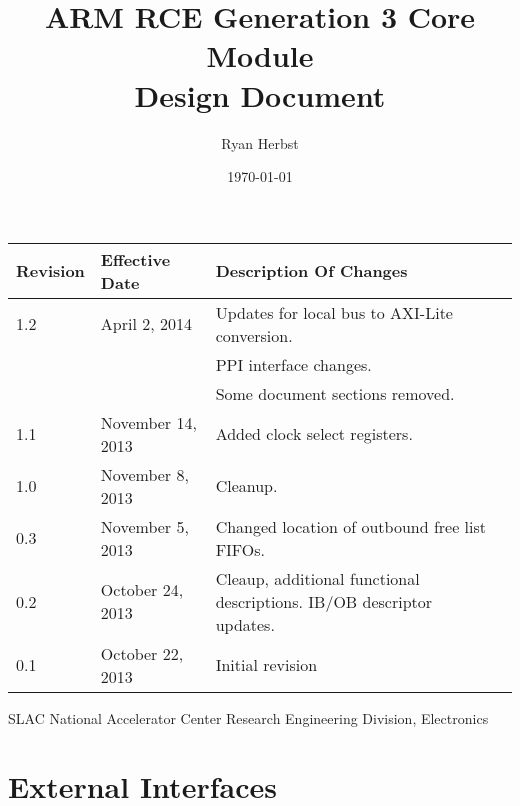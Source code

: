 \documentclass[11pt]{article}
\begin{document}
\thispagestyle{empty}

\title{ARM RCE Generation 3 Core Module \\ Design Document}
\author{Ryan Herbst}
\date{\today}

\maketitle
\begin{table}[H]
\centering
   \begin{tabular}{| l | l | l | l | } 
      \hline \textbf{Revision} & \textbf{Effective Date} & \textbf{Description Of Changes} \\
      \hline 1.2               & April 2, 2014       & Updates for local bus to AXI-Lite conversion.  \\
                               &                     & PPI interface changes.  \\
                               &                     & Some document sections removed. \\
      \hline 1.1               & November 14, 2013       & Added clock select registers.  \\
      \hline 1.0               & November 8, 2013        & Cleanup.  \\
      \hline 0.3               & November 5, 2013        & Changed location of outbound free list FIFOs.  \\
      \hline 0.2               & October 24, 2013        & Cleaup, additional functional descriptions. IB/OB descriptor updates. \\
      \hline 0.1               & October 22, 2013        & Initial revision                \\
      \hline
   \end{tabular}
\end{table}

\vfill
\begin{center}
SLAC National Accelerator Center
Research Engineering Division, Electronics
\end{center}
\newpage
\tableofcontents

\newpage
\listoftables

\newpage
\listoffigures

\newpage
\section{External Interfaces}
\label{sec:external_interfaces}
\end{document}

